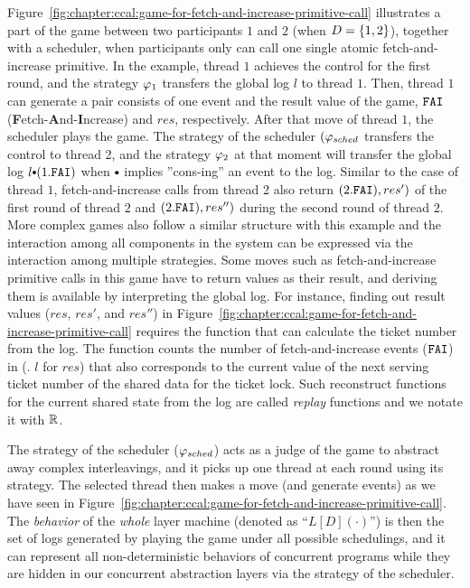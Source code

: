 Figure~\ref{fig:chapter:ccal:game-for-fetch-and-increase-primitive-call} illustrates 
a part of the game between two participants $1$ and $2$ (when $D = \{1, 2\}$), together with a scheduler,
when participants only can call one single atomic fetch-and-increase primitive.
In the example, thread $1$ achieves the control for the first round,
and the strategy  $\varphi_{1}$ transfers the global log $l$  to thread $1$. 
Then, thread $1$ can generate a pair consists of one event and the result value of the game,
${\mathrm{\texttt{FAI}}}$ (\textbf{F}etch-\textbf{A}nd-\textbf{I}ncrease) and $res$, respectively.
After that move of thread $1$, the scheduler plays the game.
The strategy of the scheduler  $(\varphi_{sched}$  transfers the control 
to thread 2, and the strategy  $\varphi_{2}$ at that moment will transfer the global log $l \cons (1.\incticket)$ when $\cons$ implies ''cons-ing'' an event to the log.
Similar to the case of thread $1$, fetch-and-increase calls from thread 2 also return $(2.{\mathrm{\texttt{FAI}}}), res')$ of the first round of thread $2$
and $(2.{\mathrm{\texttt{FAI}}}), res'')$ during the second round of thread $2$. 
More complex games also follow a similar structure with this example and the interaction among all components in the system 
can be expressed via the interaction among multiple strategies.
Some moves such as fetch-and-increase primitive calls in this game have to return values as their result,
and deriving them is available by interpreting the global log. 
For instance, finding out result values ($res$, $res'$, and $res''$) in Figure~\ref{fig:chapter:ccal:game-for-fetch-and-increase-primitive-call}
requires the function that can calculate the ticket number from the log.
The function counts the number of fetch-and-increase events (${\mathrm{\texttt{FAI}}}$) in (\eg. $l$ for $res$) that
also corresponds to the current value of the next serving ticket number of the shared data for the ticket lock.
Such reconstruct functions for the current shared state from the log are called \emph{replay} functions and we notate it with $\mathbb{R}$.

The strategy of the scheduler ($\varphi_{sched}$) acts as a judge of the game to abstract away complex interleavings, 
and it picks up one thread at each round using its strategy. 
The selected thread then makes a move  (and generate events)  as we have seen in Figure~\ref{fig:chapter:ccal:game-for-fetch-and-increase-primitive-call}.
The \emph{behavior} of the \emph{whole} layer machine (denoted as ``$L[D](\cdot)$'') 
is then the set of  logs generated by playing the game under all possible schedulings, and it can represent all non-deterministic behaviors of concurrent programs 
while they are hidden in our concurrent abstraction layers via the strategy of the scheduler.

